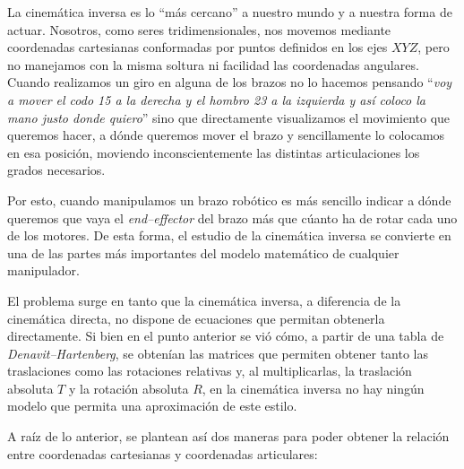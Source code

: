 La cinemática inversa es lo ``más cercano'' a nuestro mundo y a nuestra forma de actuar.
Nosotros, como seres tridimensionales, nos movemos mediante coordenadas cartesianas
conformadas por puntos definidos en los ejes $XYZ$, pero no manejamos con la misma
soltura ni facilidad las coordenadas angulares. Cuando realizamos un giro en alguna
de los brazos no lo hacemos pensando ``\textit{voy a mover el codo
15\textdegree{} a la derecha y el hombro 23\textdegree{} a la izquierda y así coloco la
mano justo donde quiero}'' sino que directamente visualizamos el movimiento que queremos 
hacer, a dónde queremos mover el brazo y sencillamente lo colocamos en esa posición,
moviendo inconscientemente las distintas articulaciones los grados necesarios.

Por esto, cuando manipulamos un brazo robótico es más sencillo indicar a dónde queremos
que vaya el \textit{end--effector} del brazo más que cúanto ha de rotar cada uno de los
motores. De esta forma, el estudio de la cinemática inversa se convierte en una de las
partes más importantes del modelo matemático de cualquier manipulador.

El problema surge en tanto que la cinemática inversa, a diferencia de la cinemática
directa, no dispone de ecuaciones que permitan obtenerla directamente. Si bien en el
punto anterior se vió cómo, a partir de una tabla de \textit{Denavit--Hartenberg},
se obtenían las matrices que permiten obtener tanto las traslaciones como las rotaciones
relativas y, al multiplicarlas, la traslación absoluta $T$ y la rotación absoluta $R$,
en la cinemática inversa no hay ningún modelo que permita una aproximación de este estilo.

A raíz de lo anterior, se plantean así dos maneras para poder obtener la relación entre
coordenadas cartesianas y coordenadas articulares:

